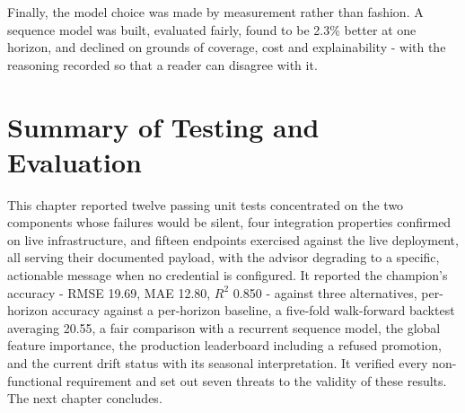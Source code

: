 Finally, the model choice was made by measurement rather than fashion. A sequence
model was built, evaluated fairly, found to be 2.3\% better at one horizon, and
declined on grounds of coverage, cost and explainability - with the reasoning
recorded so that a reader can disagree with it.

\section{Summary of Testing and Evaluation}
This chapter reported twelve passing unit tests concentrated on the two
components whose failures would be silent, four integration properties confirmed
on live infrastructure, and fifteen endpoints exercised against the live
deployment, all serving their documented payload, with the advisor degrading to a
specific, actionable message when no credential is configured. It reported the champion's accuracy - RMSE 19.69, MAE
12.80, $R^2$ 0.850 - against three alternatives, per-horizon accuracy against a
per-horizon baseline, a five-fold walk-forward backtest averaging 20.55, a fair
comparison with a recurrent sequence model, the global feature importance, the
production leaderboard including a refused promotion, and the current drift
status with its seasonal interpretation. It verified every non-functional
requirement and set out seven threats to the validity of these results. The next
chapter concludes.

